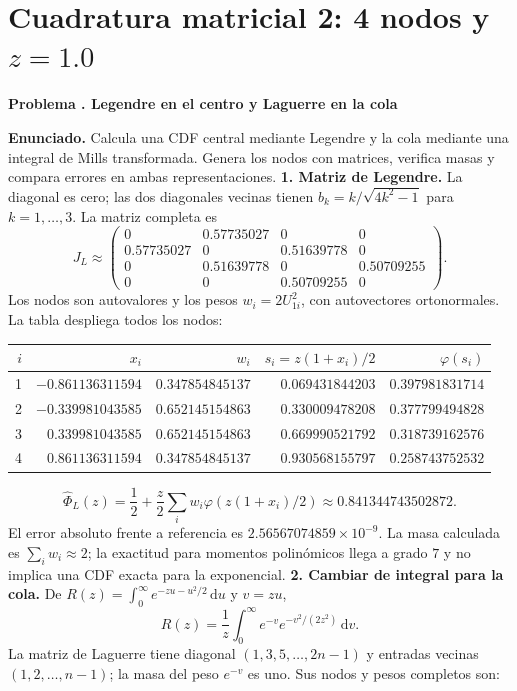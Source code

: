 \documentclass[11pt,a4paper]{article}
\newcommand{\dd}{\,\mathrm d}
\theoremstyle{definition}
\newcounter{problema}
\newenvironment{resuelto}[1]{\refstepcounter{problema}\par\medskip\Needspace{6\baselineskip}\textbf{Problema \theproblema. #1}\par}{\par\medskip}
\begin{document}
\section{\texorpdfstring{Cuadratura matricial 2: 4 nodos y $z=1.0$}{Cuadratura matricial 2: 4 nodos y z=1.0}}
\begin{resuelto}{Legendre en el centro y Laguerre en la cola}
\textbf{Enunciado.} Calcula una CDF central mediante Legendre y la cola mediante una integral de Mills transformada. Genera los nodos con matrices, verifica masas y compara errores en ambas representaciones.
\textbf{1. Matriz de Legendre.} La diagonal es cero; las dos diagonales vecinas tienen $b_k=k/\sqrt{4k^2-1}$ para $k=1,\ldots,3$. La matriz completa es
\[
J_L\approx\begin{pmatrix}0&0.57735027&0&0\\0.57735027&0&0.51639778&0\\0&0.51639778&0&0.50709255\\0&0&0.50709255&0\end{pmatrix}.
\]
Los nodos son autovalores y los pesos $w_i=2U_{1i}^2$, con autovectores ortonormales. La tabla despliega todos los nodos:

\begin{center}\small\begin{tabular}{rrrrr}
\toprule
$i$&$x_i$&$w_i$&$s_i=z(1+x_i)/2$&$\varphi(s_i)$\\
\midrule
1&$-0.861136311594$&$0.347854845137$&$0.069431844203$&$0.397981831714$\\
2&$-0.339981043585$&$0.652145154863$&$0.330009478208$&$0.377799494828$\\
3&$0.339981043585$&$0.652145154863$&$0.669990521792$&$0.318739162576$\\
4&$0.861136311594$&$0.347854845137$&$0.930568155797$&$0.258743752532$\\
\bottomrule\end{tabular}\end{center}
\[
\widehat\Phi_L(z)=\frac12+\frac z2\sum_iw_i\varphi(z(1+x_i)/2)\approx0.841344743502872.
\]
El error absoluto frente a referencia es $2.56567074859\times10^{-9}$. La masa calculada es $\sum_iw_i\approx2$; la exactitud para momentos polinómicos llega a grado $7$ y no implica una CDF exacta para la exponencial.
\textbf{2. Cambiar de integral para la cola.} De $R(z)=\int_0^\infty e^{-zu-u^2/2}\dd u$ y $v=zu$,
\[
R(z)=\frac1z\int_0^\infty e^{-v}e^{-v^2/(2z^2)}\dd v.
\]
La matriz de Laguerre tiene diagonal $(1,3,5,\ldots,2n-1)$ y entradas vecinas $(1,2,\ldots,n-1)$; la masa del peso $e^{-v}$ es uno. Sus nodos y pesos completos son:


\end{resuelto}
\end{document}
